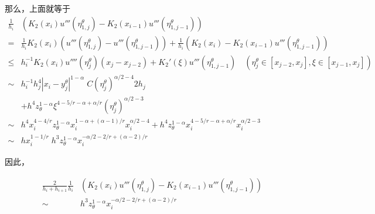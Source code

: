 \documentclass{ctexart}
\theoremstyle{definition}
\theoremstyle{remark}
\numberwithin{equation}{section}
\begin{document}
那么，上面就等于
\begin{equation}
    \begin{aligned}
        \frac{1}{h_i} & (K_2(x_{i}) u'''(\eta_{1,j}^\theta) - K_2(x_{i-1}) u'''(\eta_{1,j-1}^\theta))                                                                                      \\
        =             & \frac{1}{h_i} K_2(x_{i}) ( u'''(\eta_{1,j}^\theta) - u'''(\eta_{1,j-1}^\theta) ) + \frac{1}{h_i} (K_2(x_{i}) - K_2(x_{i-1}) u'''(\eta_{1,j-1}^\theta))             \\
        \le           & h_i^{-1}K_2(x_i) u''''(\eta_{j}^\theta) (x_j-x_{j-2}) + K_2'(\xi)u'''(\eta_{1,j-1}^\theta)    \quad (\eta_j^\theta \in [x_{j-2}, x_{j}], \xi \in [x_{j-1}, x_{j}]) \\
        \sim          & h_i^{-1} h_j^4 |x_i-y_{j}^\theta|^{1-\alpha}\; C (\eta_{j}^\theta)^{\alpha/2-4} 2h_j                                                                               \\
                      & + h^4 z_\theta^{1-\alpha} \xi^{4-5/r-\alpha+\alpha/r} (\eta_{j}^\theta)^{\alpha/2-3}                                                                               \\
        \sim          & h^4 x_i^{4-4/r}z_\theta^{1-\alpha} x_i^{1-\alpha+(\alpha-1)/r} x_i^{\alpha/2-4}
        + h^4 z_\theta^{1-\alpha} x_i^{4-5/r-\alpha+\alpha/r} x_i^{\alpha/2-3}                                                                                                             \\
        \sim          & hx_i^{1-1/r} \; h^3 z_\theta^{1-\alpha} x_i^{-\alpha/2-2/r+(\alpha-2)/r}
    \end{aligned}
\end{equation}


因此，

\begin{equation}
    \begin{aligned}
        \frac{2}{h_{i}+h_{i+1}} \frac{1}{h_i} & (K_2(x_{i}) u'''(\eta_{1,j}^\theta) - K_2(x_{i-1}) u'''(\eta_{1,j-1}^\theta)) \\
        \sim                                  & h^3 z_\theta^{1-\alpha} x_i^{-\alpha/2-2/r+(\alpha-2)/r}
    \end{aligned}
\end{equation}
\end{document}
